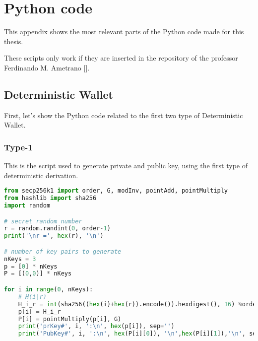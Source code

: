 \chapter{Python code}%
\label{AppendixB} %
This appendix shows the most relevant parts of the Python code made for this thesis. 

\begin{remark}
	These scripts only work if they are inserted in the repository of the professor Ferdinando M. Ametrano [\cite{13}].
\end{remark}

\section{Deterministic Wallet} 
First, let's show the Python code related to the first two type of Deterministic Wallet.

\subsection{Type-1}
\begin{flushleft}
	This is the script used to generate private and public key, using the first type of deterministic derivation.
\end{flushleft}
\begin{lstlisting}[language=Python]
from secp256k1 import order, G, modInv, pointAdd, pointMultiply
from hashlib import sha256
import random

# secret random number
r = random.randint(0, order-1)
print('\nr =', hex(r), '\n')

# number of key pairs to generate
nKeys = 3
p = [0] * nKeys
P = [(0,0)] * nKeys

for i in range(0, nKeys):
	# H(i|r)
	H_i_r = int(sha256((hex(i)+hex(r)).encode()).hexdigest(), 16) %order
	p[i] = H_i_r
	P[i] = pointMultiply(p[i], G)
	print('prKey#', i, ':\n', hex(p[i]), sep='')
	print('PubKey#', i, ':\n', hex(P[i][0]), '\n',hex(P[i][1]),'\n', sep='')
\end{lstlisting}



